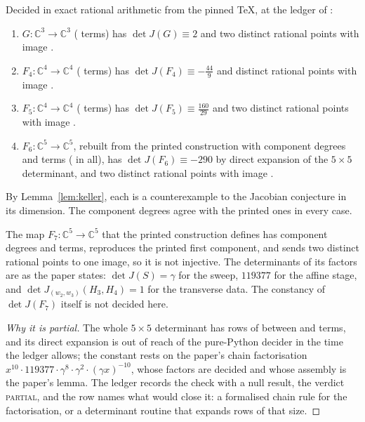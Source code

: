 \documentclass[11pt]{article}
\newcommand{\C}{\mathbb{C}}
\newcommand{\verdict}[1]{\textsc{#1}}
\begin{document}
\begin{theorem}\label{thm:gao}
Decided in exact rational arithmetic from the pinned TeX, at the ledger of \PolyGenerated{}:
\begin{enumerate}
\item $G\colon\C^3\to\C^3$ (\TermsG{} terms) has $\det J(G)\equiv2$ and two distinct rational
points with image \GaoImageG.
\item $F_4\colon\C^4\to\C^4$ (\TermsFfour{} terms) has $\det J(F_4)\equiv-\tfrac{44}{9}$ and
\FfourPoints{} distinct rational points with image \GaoImageFfour.
\item $F_5\colon\C^4\to\C^4$ (\TermsFfive{} terms) has $\det J(F_5)\equiv\tfrac{160}{29}$ and
two distinct rational points with image \GaoImageFfive.
\item $F_6\colon\C^5\to\C^5$, rebuilt from the printed construction with component degrees
\FsixDegs{} and \FsixTermsList{} terms (\TermsFsix{} in all), has $\det J(F_6)\equiv-290$ by
direct expansion of the $5\times5$ determinant, and two distinct rational points with image
\GaoImageFsix.
\end{enumerate}
By Lemma~\ref{lem:keller}, each is a counterexample to the Jacobian conjecture in its dimension.
The component degrees agree with the printed ones in every case.
\end{theorem}

\begin{proposition}\label{prop:f7}
The map $F_7\colon\C^5\to\C^5$ that the printed construction defines has component degrees
\FsevenDegs{} and \FsevenTermsList{} terms, reproduces the printed first component, and sends two
distinct rational points to one image, so it is not injective. The determinants of its factors
are as the paper states: $\det J(S)=\gamma$ for the sweep, $119377$ for the affine stage, and
$\det J_{(w_2,w_3)}(H_3,H_4)=1$ for the transverse data. The constancy of $\det J(F_7)$ itself is
not decided here.
\end{proposition}

\begin{proof}[Why it is partial]
The whole $5\times5$ determinant has rows of between \FsevenTermsMin{} and \FsevenTermsMax{}
terms, and its direct expansion is out of reach of the pure-Python decider in the time the ledger
allows; the constant rests on the paper's chain factorisation
$x^{10}\cdot119377\cdot\gamma^{8}\cdot\gamma^{2}\cdot(\gamma x)^{-10}$, whose factors are decided
and whose assembly is the paper's lemma. The ledger records the check with a null result, the
verdict \verdict{partial}, and the row names what would close it: a formalised chain rule for the
factorisation, or a determinant routine that expands rows of that size.
\end{proof}
\end{document}
